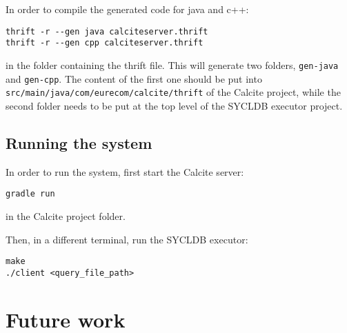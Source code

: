 \documentclass[a4paper, 10pt]{article}
\begin{document}
In order to compile the generated code for java and c++:
\begin{verbatim}
thrift -r --gen java calciteserver.thrift
thrift -r --gen cpp calciteserver.thrift
\end{verbatim}
in the folder containing the thrift file. This will generate two folders, \texttt{gen-java} and \texttt{gen-cpp}. The content of the first one should be put into \texttt{src/main/java/com/eurecom/calcite/thrift} of the Calcite project, while the second folder needs to be put at the top level of the SYCLDB executor project.

\subsection{Running the system}
In order to run the system, first start the Calcite server:
\begin{verbatim}
gradle run
\end{verbatim}
in the Calcite project folder.

Then, in a different terminal, run the SYCLDB executor:
\begin{verbatim}
make
./client <query_file_path>
\end{verbatim}

\section{Future work} \label{future_work}
\end{document}
